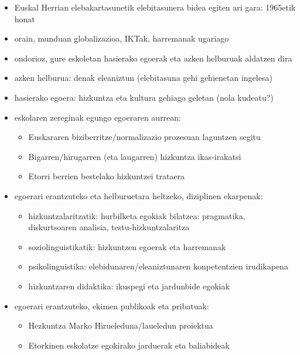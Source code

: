 \documentclass[
]{book}
\providecommand{\tightlist}{%
  \setlength{\itemsep}{0pt}\setlength{\parskip}{0pt}}
\begin{document}
\begin{itemize}
\tightlist
\item
  Euskal Herrian elebakartasunetik elebitasunera bidea egiten ari gara: 1965etik honat
\item
  orain, munduan globalizazioa, IKTak, harremanak ugariago
\item
  ondorioz, gure eskoletan hasierako egoerak eta azken helburuak aldatzen dira
\item
  azken helburua: denak eleaniztun (elebitasuna gehi gehienetan ingelesa)
\item
  hasierako egoera: hizkuntza eta kultura gehiago geletan (nola kudeatu?)
\item
  eskolaren zereginak egungo egoeraren aurrean:

  \begin{itemize}
  \tightlist
  \item
    Euskararen biziberritze/normalizazio prozesuan laguntzen segitu
  \item
    Bigarren/hirugarren (eta laugarren) hizkuntza ikas-irakatsi
  \item
    Etorri berrien bestelako hizkuntzei trataera
  \end{itemize}
\item
  egoerari erantzuteko eta helburuetara heltzeko, diziplinen ekarpenak:

  \begin{itemize}
  \tightlist
  \item
    hizkuntzalaritzatik: hurbilketa egokiak bilatzea: pragmatika, diskurtsoaren analisia, testu-hizkuntzalaritza
  \item
    soziolinguistikatik: hizkuntzen egoerak eta harremanak
  \item
    psikolinguistika: elebidunaren/eleaniztunaren konpetentzien irudikapena
  \item
    hizkuntzaren didaktika: ikuspegi eta jardunbide egokiak
  \end{itemize}
\item
  egoerari erantzuteko, ekimen publikoak eta pribatuak:

  \begin{itemize}
  \tightlist
  \item
    Hezkuntza Marko Hirueleduna/laueledun proiektua
  \item
    Etorkinen eskolatze egokirako jarduerak eta baliabideak
  \end{itemize}
\end{itemize}
\end{document}
